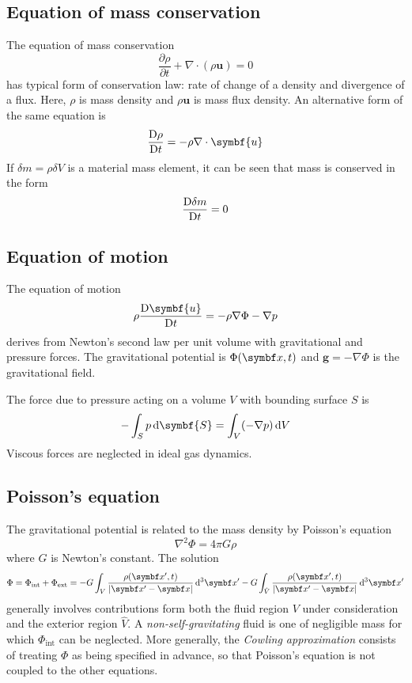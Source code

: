 \documentclass{jknotes}
\begin{document}
\subsection{Equation of mass conservation}
The equation of mass conservation
\begin{equation}
	\frac{\partial \rho}{\partial t} + \nabla \cdot (\rho \symbf{u}) = 0
\end{equation}
has typical form of conservation law: rate of change of a density and
divergence of a flux. Here, $\rho$ is mass density and $\rho \symbf{u}$ is mass
flux density.  An alternative form of the same equation is
\begin{equation}
	\frac{\diffD \rho}{\diffD t} = - \rho \nabla \cdot \symbf{u}
\end{equation}
If $\delta m = \rho \delta V$ is a material mass element, it can be seen that
mass is conserved in the form
\begin{equation}
	\frac{\mathrm{D} \delta m }{\mathrm{D} t} = 0
\end{equation}

\subsection{Equation of motion}
The equation of motion
\begin{equation}
	\rho \frac{\diffD \symbf{u}}{\diffD t} = - \rho \nabla \Phi - \nabla p
\end{equation}
derives from Newton's second law per unit volume with gravitational and
pressure forces. The gravitational potential is $\Phi(\x,t)$ and $\symbf{g} =
-\nabla\Phi$ is the gravitational field.

The force due to pressure acting on a volume $V$ with bounding surface $S$ is
\begin{equation}
	-\int_S p\, \diffd \symbf{S} = \int_V (-\nabla p) \, \diffd V
\end{equation}
Viscous forces are neglected in ideal gas dynamics.

\subsection{Poisson's equation}
The gravitational potential is related to the mass density by Poisson's
equation
\begin{equation}
\nabla^2 \Phi = 4\pi G \rho
\end{equation}
where $G$ is Newton's constant. The solution
\begin{equation}
	\Phi = \Phi_{\text{int}} + \Phi_{\text{ext}} = - G \int_V
	\frac{\rho(\x',t)}{\abs{\x'-\x}} \, \diffd^3 \x' - G \int_{\hat{V}} 
	\frac{\rho(\x',t)}{\abs{\x'-\x}} \, \diffd^3 \x' 
\end{equation}
generally involves contributions form both the fluid region $V$ under
consideration and the exterior region $\hat{V}$. A \emph{non-self-gravitating}
fluid is one of negligible mass for which $\Phi_{\text{int}}$ can be
neglected. More generally, the \emph{Cowling approximation} consists of
treating $\Phi$ as being specified in advance, so that Poisson's equation is
not coupled to the other equations.
\end{document}
